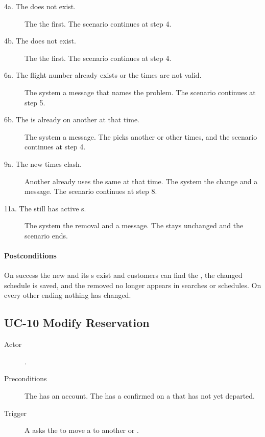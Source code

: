 \begin{description}
\item[4a. The  does not exist.] The   the
   first. The scenario continues at step 4.
\item[4b. The  does not exist.] The 
   the  first. The scenario continues at step 4.
\item[6a. The flight number already exists or the times are not valid.] The
  system  a message that names the problem. The scenario continues at
  step 5.
\item[6b. The  is already on another  at that time.]
  The system  a message. The  picks another
   or other times, and the scenario continues at step 4.
\item[9a. The new times clash.] Another  already uses the same
   at that time. The system  the change and
   a message. The scenario continues at step 8.
\item[11a. The  still has active s.] The system
   the removal and  a message. The  stays
  unchanged and the scenario ends.
\end{description}

\paragraph{Postconditions}

On success the new  and its s exist and customers can find
the , the changed schedule is saved, and the removed 
no longer appears in searches or schedules. On every other ending nothing has
changed.

\subsection*{UC-10 Modify Reservation}

\begin{description}
\item[Actor] .
\item[Preconditions] The  has an account. The
   has a confirmed  on a  that has
  not yet departed.
\item[Trigger] A  asks the  to move a
   to another  or .
\end{description}

